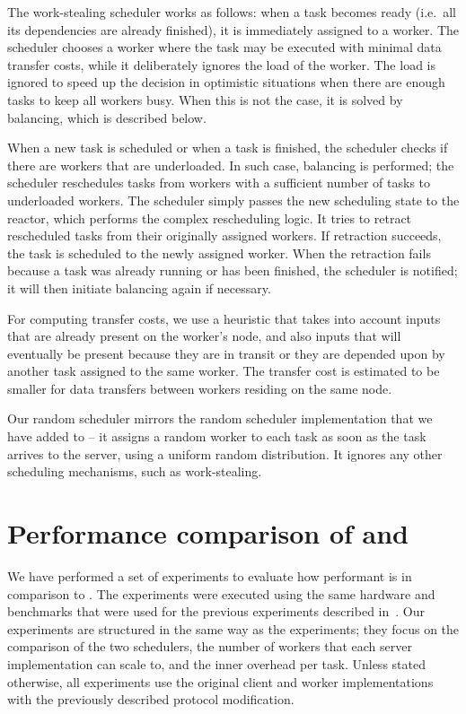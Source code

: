 The \rsds{} work-stealing scheduler works as follows: when a task becomes ready
(i.e.\ all its dependencies are already finished), it is immediately assigned to a worker. The
scheduler chooses a worker where the task may be executed with minimal data transfer costs, while
it deliberately ignores the load of the worker. The load is ignored to speed up the decision in
optimistic situations when there are enough tasks to keep all workers busy. When this is not the
case, it is solved by balancing, which is described below.

When a new task is scheduled or when a task is finished, the scheduler checks if there are workers
that are underloaded. In such case, balancing is performed; the scheduler reschedules tasks from
workers with a sufficient number of tasks to underloaded workers. The scheduler simply passes the
new scheduling state to the reactor, which performs the complex rescheduling logic. It tries to
retract rescheduled tasks from their originally assigned workers. If retraction succeeds, the task
is scheduled to the newly assigned worker. When the retraction fails because a task was already
running or has been finished, the scheduler is notified; it will then initiate balancing again if
necessary.

For computing transfer costs, we use a heuristic that takes into account inputs that are already
present on the worker's node, and also inputs that will eventually be present because they are in
transit or they are depended upon by another task assigned to the same worker. The transfer cost is
estimated to be smaller for data transfers between workers residing on the same node.

Our random scheduler mirrors the random scheduler implementation that we have added to
\dask{} -- it assigns a random worker to each task as soon as the task arrives
to the server, using a uniform random distribution. It ignores any other scheduling mechanisms,
such as work-stealing.

\section{Performance comparison of \dask{} and \rsds{}}
\label{sec:rsds-dask-comparison}
We have performed a set of experiments to evaluate how performant is \rsds{} in
comparison to \dask{}. The experiments were executed using the same hardware
and benchmarks that were used for the previous \dask{} experiments described
in~. Our experiments are structured in the same way as the
\dask{} experiments; they focus on the comparison of the two schedulers, the
number of workers that each server implementation can scale to, and the inner overhead per task.
Unless stated otherwise, all experiments use the original \dask{} client and
worker implementations with the previously described protocol modification.

